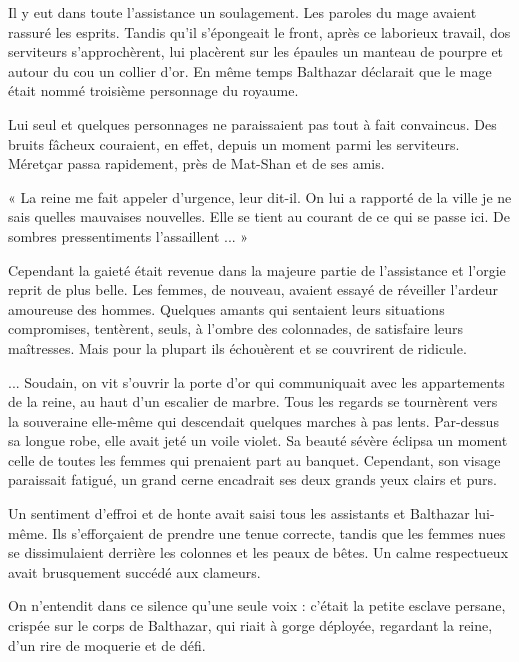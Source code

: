 \documentclass[a4paper, 11pt, oneside, polutonikogreek, french]{article}
\begin{document}
Il y eut dans toute l'assistance un soulagement. Les paroles du mage avaient rassuré les esprits. Tandis qu'il s'épongeait le front, après ce laborieux travail, dos serviteurs s'approchèrent, lui placèrent sur les épaules un manteau de pourpre et autour du cou un collier d'or. En même temps Balthazar déclarait que le mage était nommé troisième personnage du royaume.

\bigskip
\centerline{\EightStarTaper}
\centerline{\EightStarTaper\EightStarTaper}
\bigskip

Lui seul et quelques personnages ne paraissaient pas tout à fait convaincus. Des bruits fâcheux couraient, en effet, depuis un moment parmi les serviteurs. Méretçar passa rapidement, près de Mat-Shan et de ses amis.

« La reine me fait appeler d'urgence, leur dit-il. On lui a rapporté de la ville je ne sais quelles mauvaises nouvelles. Elle se tient au courant de ce qui se passe ici. De sombres pressentiments l'assaillent ... »

Cependant la gaieté était revenue dans la majeure partie de l'assistance et l'orgie reprit de plus belle. Les femmes, de nouveau, avaient essayé de réveiller l'ardeur amoureuse des hommes. Quelques amants qui sentaient leurs situations compromises, tentèrent, seuls, à l'ombre des colonnades, de satisfaire leurs maîtresses. Mais pour la plupart ils échouèrent et se couvrirent de ridicule.

\bigskip
\centerline{\EightStarTaper}
\centerline{\EightStarTaper\EightStarTaper}
\bigskip

... Soudain, on vit s'ouvrir la porte d'or qui communiquait avec les appartements de la reine, au haut d'un escalier de marbre. Tous les regards se tournèrent vers la souveraine elle-même qui descendait quelques marches à pas lents. Par-dessus sa longue robe, elle avait jeté un voile violet. Sa beauté sévère éclipsa un moment celle de toutes les femmes qui prenaient part au banquet. Cependant, son visage paraissait fatigué, un grand cerne encadrait ses deux grands yeux clairs et purs.

Un sentiment d'effroi et de honte avait saisi tous les assistants et Balthazar lui-même. Ils s'efforçaient de prendre une tenue correcte, tandis que les femmes nues se dissimulaient derrière les colonnes et les peaux de bêtes. Un calme respectueux avait brusquement succédé aux clameurs.

On n'entendit dans ce silence qu'une seule voix : c'était la petite esclave persane, crispée sur le corps de Balthazar, qui riait à gorge déployée, regardant la reine, d'un rire de moquerie et de défi.
\end{document}
